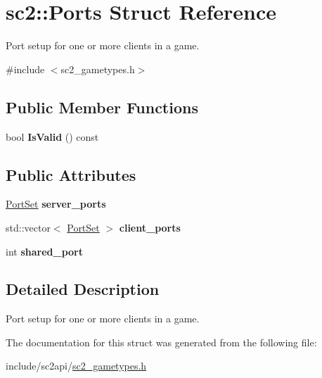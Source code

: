 \hypertarget{structsc2_1_1_ports}{}\section{sc2\+:\+:Ports Struct Reference}
\label{structsc2_1_1_ports}


Port setup for one or more clients in a game.  




{\ttfamily \#include $<$sc2\+\_\+gametypes.\+h$>$}

\subsection*{Public Member Functions}
\begin{DoxyCompactItemize}
\item 
\mbox{\label{structsc2_1_1_ports_afdd1673472df7ec0704500630b7c4320}} 
bool {\bfseries Is\+Valid} () const
\end{DoxyCompactItemize}
\subsection*{Public Attributes}
\begin{DoxyCompactItemize}
\item 
\mbox{\label{structsc2_1_1_ports_abfb63749e274cb8634d4984bb1cf9420}} 
\hyperlink{structsc2_1_1_port_set}{Port\+Set} {\bfseries server\+\_\+ports}
\item 
\mbox{\label{structsc2_1_1_ports_a3562b5e11358b0450d526d7db6323a10}} 
std\+::vector$<$ \hyperlink{structsc2_1_1_port_set}{Port\+Set} $>$ {\bfseries client\+\_\+ports}
\item 
\mbox{\label{structsc2_1_1_ports_a6f63d74aab5594bc30657ad8fa14f96f}} 
int {\bfseries shared\+\_\+port}
\end{DoxyCompactItemize}


\subsection{Detailed Description}
Port setup for one or more clients in a game. 

The documentation for this struct was generated from the following file\+:\begin{DoxyCompactItemize}
\item 
include/sc2api/\hyperlink{sc2__gametypes_8h}{sc2\+\_\+gametypes.\+h}\end{DoxyCompactItemize}
